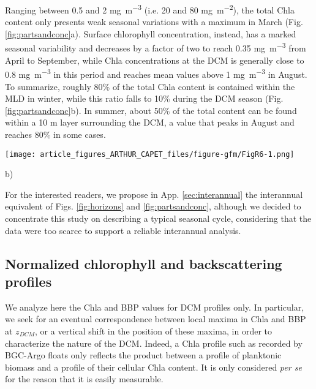 \documentclass[journal abbreviation, manuscript]{copernicus}
\begin{document}
Ranging between 0.5 and 2 \unit{mg~m^{-3}} (i.e. 20 and 80 \unit{mg~m^{-2}}), the total Chla content only presents weak seasonal variations with a maximum in March (Fig. \ref{fig:partsandconc}a). 
Surface chlorophyll concentration, instead, has a marked seasonal variability and decreases by a factor of two to reach 0.35 \unit{mg~m^{-3}} from April to September, while Chla concentrations at the DCM is generally close to 0.8 \unit{mg~m^{-3}} in this period and reaches mean values above 1 \unit{mg~m^{-3}} in August.
To summarize, roughly 80\% of the total Chla content is contained within the MLD in winter, while this ratio falls to 10\% during the DCM season (Fig. \ref{fig:partsandconc}b).
In summer, about 50\% of the total content can be found within a 10 \unit{m} layer surrounding the DCM, a value that peaks in August and reaches 80\% in some cases. 

\begin{figure*}[h!] %
    \centering
    \texttt{[image: article\_figures\_ARTHUR\_CAPET\_files/figure-gfm/FigR6-1.png]}
    \caption{Seasonal variations in a) surface, DCM and total Chla concentrations and b) relative parts of the total Chla content around specific horizons. The total Chla concentration in a) is the vertical integral of Chla concentration scaled by a constant depth of 40 \unit{m} to reach unit of volumetric concentrations (\unit{mg~m^{-3}}).}
    b) 
    \label{fig:partsandconc}
\end{figure*}

For the interested readers, we propose in App. \ref{sec:interannual} the interannual equivalent of Figs. \ref{fig:horizons} and \ref{fig:partsandconc}, although we decided to concentrate this study on describing a typical seasonal cycle, considering that the data were too scarce to support a reliable interannual analysis.

\subsection{Normalized chlorophyll and backscattering profiles}
We analyze here the Chla and BBP values for DCM profiles only.
In particular, we seek for an eventual correspondence between local maxima in Chla and BBP at $z_{DCM}$, or a vertical shift in the position of these maxima, in order to characterize the nature of the DCM.
Indeed, a Chla profile such as recorded by BGC-Argo floats only reflects the product between a profile of planktonic biomass and a profile of their cellular Chla content.
It is only considered \textit{per se} for the reason that it is easily measurable. 
\end{document}
